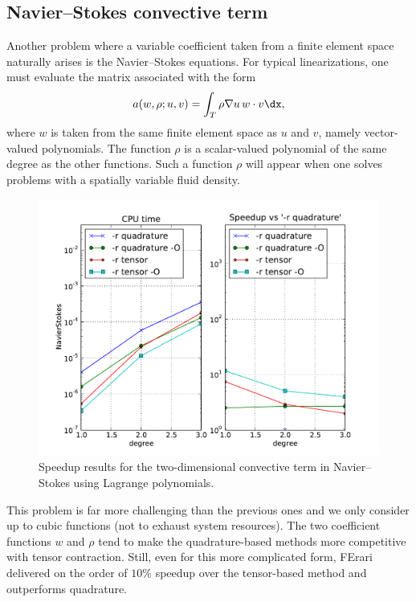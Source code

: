 \subsection{Navier--Stokes convective term}
Another problem where a variable coefficient taken from a finite
element space naturally arises is the Navier--Stokes equations. For
typical linearizations, one must evaluate the matrix associated with
the form
\begin{equation}
  a(w, \rho; u, v) = \int_T \rho \nabla u \, w \cdot v \dx,
\end{equation}
where $w$ is taken from the same finite element space as $u$ and $v$, namely vector-valued polynomials. The function $\rho$ is a
scalar-valued polynomial of the same degree as the other
functions. Such a function $\rho$ will appear when one solves
problems with a spatially variable fluid density.
\begin{figure}
\bwfig
  \centering
  \includegraphics[width=\largefig]{chapters/kirby-3/pdf/NavierStokes.pdf}
  \caption{Speedup results for the two-dimensional convective term
    in Navier--Stokes using Lagrange polynomials.}
  \label{fig:NavierStokes}
\end{figure}

This problem is far more challenging than the previous ones and we
only consider up to cubic functions (not to exhaust system
resources). The two coefficient functions $ w $ and $ \rho $ tend to
make the quadrature-based methods more competitive with tensor
contraction.  Still, even for this more complicated form, FErari
delivered on the order of $ 10\% $ speedup over the tensor-based
method and outperforms quadrature.

